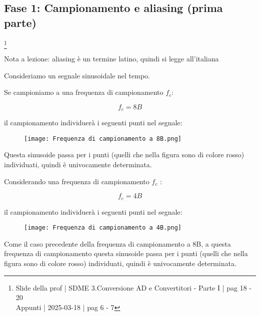 \newpage 

\subsection{Fase 1: Campionamento e aliasing (prima parte)}
\footnote{Slide della prof | SDME 3.Conversione AD e Convertitori - Parte I | pag 18 - 20 \\  
Appunti | 2025-03-18 | pag 6 - 7}

\begin{tcolorbox}
    Nota a lezione: aliasing è un termine latino, quindi si legge all'italiana
\end{tcolorbox}

Consideriamo un segnale sinusoidale nel tempo. \newline 

Se campioniamo a una frequenza di campionamento $f_c$: 

{
    \Large 
    \begin{equation}
        f_c = 8B
    \end{equation}
}

il campionamento individuerà i seguenti punti nel segnale: 

\begin{figure}[h]
    \centering
    \texttt{[image: Frequenza di campionamento a 8B.png]}
\end{figure}

Questa sinusoide passa per i punti (quelli che nella figura sono di colore rosso) individuati, quindi è univocamente determinata. \newline 

Considerando una frequenza di campionamento $f_c$ : 

{
    \Large 
    \begin{equation}
        f_c = 4B
    \end{equation}
}

il campionamento individuerà i seguenti punti nel segnale: 

\begin{figure}[h]
    \centering
    \texttt{[image: Frequenza di campionamento a 4B.png]}
\end{figure}

Come il caso precedente della frequenza di campionamento a 8B, 
a questa frequenza di campionamento 
questa sinusoide passa per i punti (quelli che nella figura sono di colore rosso) individuati, quindi è univocamente determinata. \newline 


